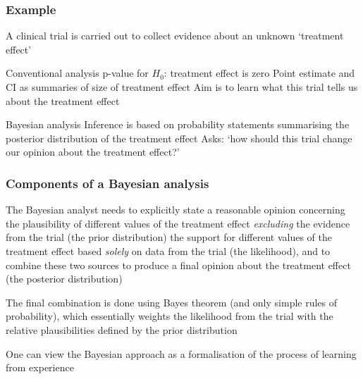 \begin{frame}[t]

\frametitle{Example}

A clinical trial is carried out to collect evidence about an
unknown \lq treatment effect'

\vspace{5mm}

\alert{Conventional analysis}\vspace{1mm}
\bi
\I p-value for $H_0$: treatment effect is zero\vspace{1mm}
\I Point estimate and CI as summaries of  size of treatment effect\vspace{1mm}
\ei
Aim is to learn what this trial tells us about the treatment effect

\vspace{5mm}

\alert{Bayesian analysis}\vspace{1mm}
\bi
\I Inference is based on probability statements summarising the posterior
   distribution of the treatment effect\vspace{1mm}
\ei
Asks: \lq how should this trial change our opinion about
   the treatment effect?'
\end{frame}


\begin{frame}[t]

\frametitle{Components of a Bayesian analysis}

The Bayesian analyst needs to explicitly state\vspace{1mm}
\bi
\I a reasonable opinion concerning the plausibility
   of different values of the treatment effect
  {\it excluding} the evidence from the trial
  (the \alert{prior distribution})\vspace{1mm}
\I the support for different values of the treatment
   effect based {\it solely} on data from the
   trial (the \alert{likelihood}),\vspace{1mm}
\ei
and to combine these two sources to produce\vspace{1mm}
\bi
\I a final opinion about the treatment effect
   (the \alert{posterior distribution})
\ei

\vspace{2mm}
The final combination is done using Bayes theorem (and only simple rules of probability), which essentially weights the likelihood from the trial with the relative plausibilities defined by the prior distribution

\vspace{2mm}
One can view the Bayesian approach as a formalisation of the process
of learning from experience
\end{frame}

